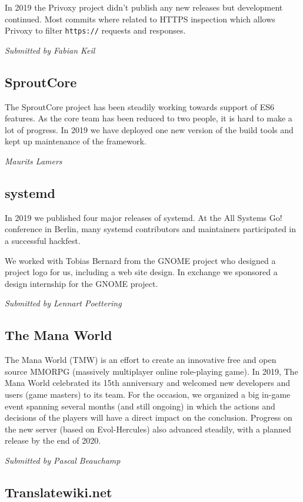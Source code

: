 \documentclass[a4paper]{report}
\begin{document}
In 2019 the Privoxy project didn't publish any new releases but
development continued. Most commits where related to HTTPS inspection
which allows Privoxy to filter \texttt{https://} requests and responses.

{\em Submitted by Fabian Keil}

\subsection{SproutCore}

The SproutCore project has been steadily working towards support of ES6
features.  As the core team has been reduced to two people, it is hard
to make a lot of progress.  In 2019 we have deployed one new version of
the build tools and kept up maintenance of the framework.

{\em Maurits Lamers }

\subsection{systemd}

In 2019 we published four major releases of systemd. At the All Systems
Go! conference in Berlin, many systemd contributors and maintainers
participated in a successful hackfest.

We worked with Tobias Bernard from the GNOME project who designed a
project logo for us, including a web site design. In exchange we
sponsored a design internship for the GNOME project.

{\em Submitted by Lennart Poettering}

\subsection{The Mana World}

The Mana World (TMW) is an effort to create an innovative free and open
source MMORPG (massively multiplayer online role-playing game).  In 2019,
The Mana World celebrated its 15th anniversary and welcomed new developers
and users (game masters) to its team. For the occasion, we organized a big
in-game event spanning several months (and still ongoing) in which the
actions and decisions of the players will have a direct impact on the
conclusion.  Progress on the new server (based on Evol-Hercules) also
advanced steadily, with a planned release by the end of 2020.

{\em Submitted by Pascal Beauchamp}

\subsection{Translatewiki.net}
\end{document}
